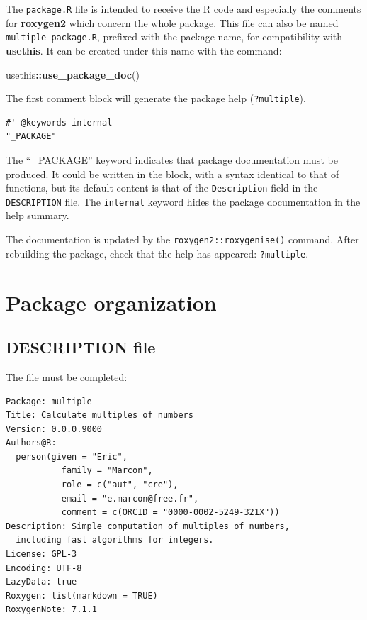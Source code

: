 \documentclass[
  12pt,
  american,
  a4paper,
  extrafontsizes,onecolumn,openright
  ]{memoir}
\newenvironment{Shaded}{\begin{snugshade}}{\end{snugshade}}
\newcommand{\FunctionTok}[1]{\textcolor[rgb]{0.13,0.29,0.53}{\textbf{#1}}}
\newcommand{\NormalTok}[1]{#1}
\newcommand{\SpecialCharTok}[1]{\textcolor[rgb]{0.81,0.36,0.00}{\textbf{#1}}}
\begin{document}
The \texttt{package.R} file is intended to receive the R code and especially the comments for \textbf{roxygen2} which concern the whole package.
This file can also be named \texttt{multiple-package.R}, prefixed with the package name, for compatibility with \textbf{usethis}.
It can be created under this name with the command:

\scriptsize

\begin{Shaded}
\begin{Highlighting}[]
\NormalTok{usethis}\SpecialCharTok{::}\FunctionTok{use\_package\_doc}\NormalTok{()}
\end{Highlighting}
\end{Shaded}

\normalsize

The first comment block will generate the package help (\texttt{?multiple}).

\begin{verbatim}
#' @keywords internal 
"_PACKAGE"
\end{verbatim}

The ``\_PACKAGE'' keyword indicates that package documentation must be produced.
It could be written in the block, with a syntax identical to that of functions, but its default content is that of the \texttt{Description} field in the \texttt{DESCRIPTION} file.
The \texttt{internal} keyword hides the package documentation in the help summary.

The documentation is updated by the \texttt{roxygen2::roxygenise()} command.
After rebuilding the package, check that the help has appeared: \texttt{?multiple}.

\section{Package organization}\label{package-organization}

\subsection{DESCRIPTION file}\label{sec:package-description}

The file must be completed:

\begin{verbatim}
Package: multiple
Title: Calculate multiples of numbers
Version: 0.0.0.9000
Authors@R: 
  person(given = "Eric",
           family = "Marcon",
           role = c("aut", "cre"),
           email = "e.marcon@free.fr",
           comment = c(ORCID = "0000-0002-5249-321X"))
Description: Simple computation of multiples of numbers, 
  including fast algorithms for integers.
License: GPL-3
Encoding: UTF-8
LazyData: true
Roxygen: list(markdown = TRUE)
RoxygenNote: 7.1.1
\end{verbatim}
\end{document}
